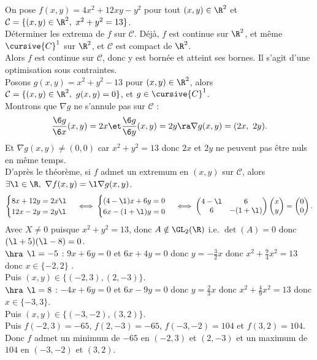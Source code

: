 \documentclass[11pt]{article}
\begin{document}
\begin{ex}{}{}
    On pose $f(x,y)=4x^2+12xy-y^2$ pour tout $(x,y)\in\R^2$ et $\mathcal{C}=\{(x,y)\in\R^2, ~ x^2+y^2=13\}$.\\
    Déterminer les extrema de $f$ sur $\mathcal{C}$.
    \tcblower
    Déjà, $f$ est continue sur $\R^2$, et même $\cursive{C}^1$ sur $\R^2$, et $\mathcal{C}$ est compact de $\R^2$.\\
    Alors $f$ est continue sur $\mathcal{C}$, donc y est bornée et atteint ses bornes. Il s'agit d'une optimisation sous contraintes.\\
    Posons $g(x,y)=x^2+y^2-13$ pour $(x,y)\in\R^2$, alors $\mathcal{C}=\{(x,y)\in\R^2, ~ g(x,y)=0\}$, et $g\in\cursive{C}^1$.\\
    Montrons que $\nabla g$ ne s'annule pas sur $\mathcal{C}$ :
    \begin{equation*}
        \frac{\6 g}{\6 x}(x,y) = 2x \et \frac{\6 g}{\6 y}(x,y) = 2y \ra \nabla g(x,y) = (2x,~2y).
    \end{equation*}
    Et $\nabla g(x,y)\neq(0,0)$ car $x^2+y^2=13$ donc $2x$ et $2y$ ne peuvent pas être nuls en même temps.\\
    D'après le théorème, si $f$ admet un extremum en $(x,y)$ sur $\mathcal{C}$, alors $\exists \l \in \R, ~ \nabla f(x,y) = \l \nabla g(x,y)$.
    \begin{equation*}
        \begin{cases} 8x + 12y = 2x\l \\ 12x - 2y = 2y\l\end{cases} \iff \begin{cases}(4-\l)x + 6y = 0 \\ 6x - (1+\l)y=0\end{cases} \iff \begin{pmatrix}4 - \l & 6 \\ 6 & -(1+\l)\end{pmatrix}\begin{pmatrix}x\\y\end{pmatrix}=\begin{pmatrix}0\\0\end{pmatrix}.
    \end{equation*}
    Avec $X\neq0$ puisque $x^2+y^2=13$, donc $A\notin\GL_2(\R)$ i.e. $\det(A)=0$ donc $(\l+5)(\l-8)=0$.\\
    $\hra$ $\l=-5$ : $9x+6y=0$ et $6x+4y=0$ donc $y=-\frac{3}{2}x$ donc $x^2+\frac{9}{4}x^2 = 13$ donc $x\in\{-2,2\}$ .\\
    Puis $(x,y)\in\{(-2,3),(2,-3)\}$.\\
    $\hra$ $\l=8$ : $-4x+6y = 0$ et $6x -9y = 0$ donc $y=\frac{2}{3}x$ donc $x^2 + \frac{4}{9}x^2 = 13$ donc $x\in\{-3,3\}$.\\
    Puis $(x,y)\in\{(-3,-2), (3,2)\}$.\\
    Puis $f(-2,3)= -65$, $f(2,-3)= -65$, $f(-3,-2)= 104$ et $f(3,2)=104$.\\
    Donc $f$ admet un minimum de $-65$ en $(-2,3)$ et $(2,-3)$ et un maximum de $104$ en $(-3,-2)$ et $(3,2)$.
\end{ex}
\end{document}
